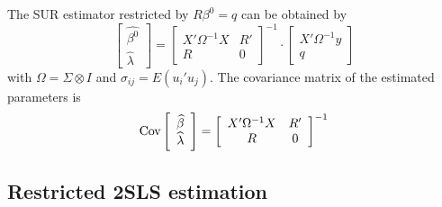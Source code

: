 The SUR estimator restricted by $R \beta^0 = q$ can be obtained by
\begin{equation}
   \left[ \begin{array}{c}
      \widehat{\beta^0} \\ \widehat{\lambda}
   \end{array} \right]
   =
   \left[ \begin{array}{cc}
      X' \Omega^{-1} X & R' \\ 
      R & 0
   \end{array} \right]^{-1}
   \cdot
   \left[ \begin{array}{c}
      X' \Omega^{-1} y \\ q 
   \end{array} \right]
\end{equation}
with $\Omega = \Sigma \otimes I$ and
$\sigma_{ij} = E \left( u_i' u_j \right)$.
The covariance matrix of the estimated parameters is
\begin{equation}
   \text{Cov} 
   \left[ \begin{array}{c}
      \widehat{\beta} \\ \widehat{\lambda}
   \end{array} \right] 
   = 
   \left[ \begin{array}{cc}
      X' \Omega^{-1} X & R' \\ 
      R & 0
   \end{array} \right]^{-1}
\end{equation}

\subsection{Restricted 2SLS estimation}

